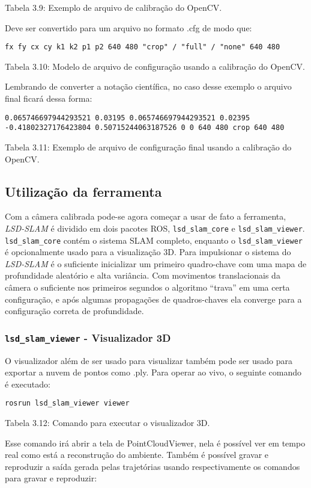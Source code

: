 Tabela 3.9: Exemplo de arquivo de calibração do OpenCV.

Deve ser convertido para um arquivo no formato .cfg de modo que:

\texttt{fx fy cx cy k1 k2 p1 p2
640 480
"crop" / "full" / "none"
640 480}

Tabela 3.10: Modelo de arquivo de configuração usando a calibração do OpenCV.

Lembrando de converter a notação científica, no caso desse exemplo o arquivo final ficará dessa forma:


\texttt{0.065746697944293521 0.03195 0.065746697944293521 0.02395 -0.41802327176423804 0.50715244063187526 0 0 
640 480
crop
640 480}

Tabela 3.11: Exemplo de arquivo de configuração final usando a calibração do OpenCV.

\subsection{Utilização da ferramenta}

Com a câmera calibrada pode-se agora começar a usar de fato a ferramenta, \textit{LSD-SLAM} é dividido em dois pacotes ROS, \texttt{lsd\_slam\_core} e \texttt{lsd\_slam\_viewer}. \texttt{lsd\_slam\_core} contém o sistema SLAM completo, enquanto o \texttt{lsd\_slam\_viewer} é opcionalmente usado para a visualização 3D.
Para impulsionar o sistema do \textit{LSD-SLAM} é o suficiente inicializar um primeiro quadro-chave com uma mapa de profundidade aleatório e alta variância. Com movimentos translacionais da câmera o suficiente nos primeiros segundos o algoritmo “trava” em uma certa configuração, e após algumas propagações de quadros-chaves ela converge para a configuração correta de profundidade.

\subsubsection{\texttt{lsd\_slam\_viewer} - Visualizador 3D}

O visualizador além de ser usado para visualizar também pode ser usado para exportar a nuvem de pontos como .ply. Para operar ao vivo, o seguinte comando é executado:

\texttt{rosrun lsd\_slam\_viewer viewer}

Tabela 3.12: Comando para executar o visualizador 3D.

Esse comando irá abrir a tela de PointCloudViewer, nela é possível ver em tempo real como está a reconstrução do ambiente. Também é possível gravar e reproduzir a saída gerada pelas trajetórias usando respectivamente os comandos para gravar e reproduzir:

